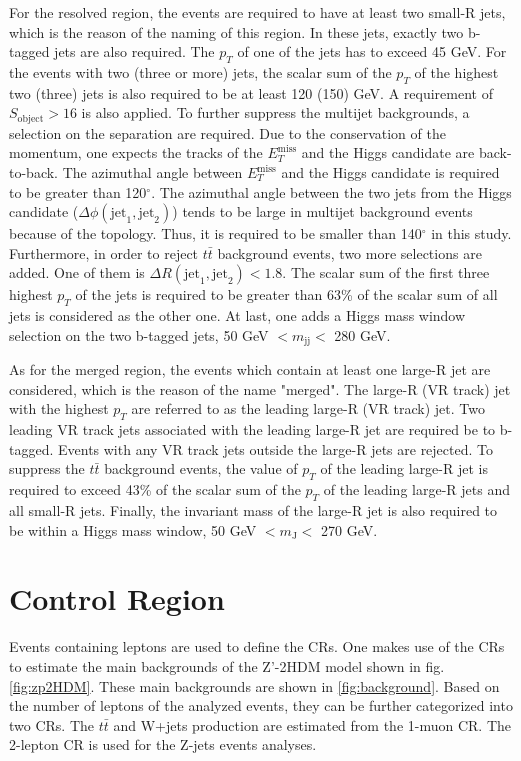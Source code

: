 \documentclass[class=NCU_thesis, crop=false]{standalone}
\begin{document}
		For the resolved region, the events are required to have at least two small-R jets, which is the reason of the naming of this region. In these jets, exactly two b-tagged jets are also required. The $p_T$ of one of the jets has to exceed 45 GeV. For the events with two (three or more) jets, the scalar sum of the $p_T$ of the highest two (three) jets is also required to be at least 120 (150) GeV. A requirement of $S_{\mathrm{object}} > 16$ is also applied. To further suppress the multijet backgrounds, a selection on the separation are required. Due to the conservation of the momentum, one expects the tracks of the $E_T^{\mathrm{miss}}$ and the Higgs candidate are back-to-back. The azimuthal angle between $E_T^{\mathrm{miss}}$ and the Higgs candidate is required to be greater than 120$^\circ$. The azimuthal angle between the two jets from the Higgs candidate ($\Delta \phi(\mathrm{jet}_1, \mathrm{jet}_2)$) tends to be large in multijet background events because of the topology. Thus, it is required to be smaller than 140$^\circ$ in this study. Furthermore, in order to reject $t\bar{t}$ background events, two more selections are added. One of them is $\Delta R(\mathrm{jet}_1, \mathrm{jet}_2) < 1.8$. The scalar sum of the first three highest $p_T$ of the jets is required to be greater than 63\% of the scalar sum of all jets is considered as the other one. At last, one adds a Higgs mass window selection on the two b-tagged jets, 50 GeV $< m_{\mathrm{jj}} <$ 280 GeV.
	
		As for the merged region, the events which contain at least one large-R jet are considered, which is the reason of the name "merged". The large-R (VR track) jet with the highest $p_T$ are referred to as the leading large-R (VR track) jet. Two leading VR track jets associated with the leading large-R jet are required be to b-tagged. Events with any VR track jets outside the large-R jets are rejected. To suppress the $t\bar{t}$ background events, the value of $p_T$ of the leading large-R jet is required to exceed 43\% of the scalar sum of the $p_T$ of the leading large-R jets and all small-R jets. Finally, the invariant mass of the large-R jet is also required to be within a Higgs mass window, 50 GeV $< m_{\mathrm{J}} <$ 270 GeV.
	
	\section{Control Region}
		Events containing leptons are used to define the CRs. One makes use of the CRs to estimate the main backgrounds of the Z'-2HDM model shown in fig. \ref{fig:zp2HDM}. These main backgrounds are shown in \ref{fig:background}. Based on the number of leptons of the analyzed events, they can be further categorized into two CRs. The $t\bar{t}$ and W+jets production are estimated from the 1-muon CR. The 2-lepton CR is used for the Z-jets events analyses.
	
\end{document}
